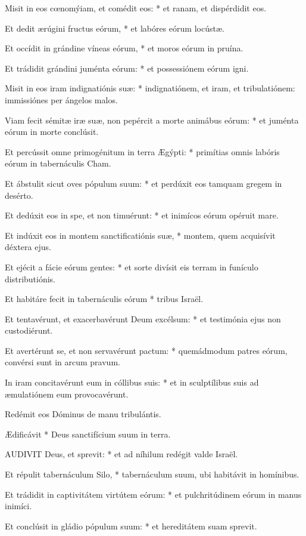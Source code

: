 Misit in eos cœnomýiam, et comédit eos: * et ranam, et dispérdidit eos.

Et dedit ærúgini fructus eórum, * et labóres eórum locústæ.

Et occídit in grándine víneas eórum, * et moros eórum in pruína.

Et trádidit grándini juménta eórum: * et possessiónem eórum igni.

Misit in eos iram indignatiónis suæ: * indignatiónem, et iram, et tribulatiónem: immissiónes per ángelos malos.

Viam fecit sémitæ iræ suæ, non pepércit a morte animábus eórum: * et juménta eórum in morte conclúsit.

Et percússit omne primogénitum in terra Ægýpti: * primítias omnis labóris eórum in tabernáculis Cham.

Et ábstulit sicut oves pópulum suum: * et perdúxit eos tamquam gregem in desérto.

Et dedúxit eos in spe, et non timuérunt: * et inimícos eórum opéruit mare.

Et indúxit eos in montem sanctificatiónis suæ, * montem, quem acquisívit déxtera ejus.

Et ejécit a fácie eórum gentes: * et sorte divísit eis terram in funículo distributiónis.

Et habitáre fecit in tabernáculis eórum * tribus Israël.

Et tentavérunt, et exacerbavérunt Deum excélsum: * et testimónia ejus non custodiérunt.

Et avertérunt se, et non servavérunt pactum: * quemádmodum patres eórum, convérsi sunt in arcum pravum.

In iram concitavérunt eum in cóllibus suis: * et in sculptílibus suis ad æmulatiónem eum provocavérunt.

 Redémit eos Dóminus de manu tribulántis.

 Ædificávit * Deus sanctifícium suum in terra.


\lettrine[lines=2]{A}{UDIVIT} Deus, et sprevit: * et ad níhilum redégit valde Israël.

Et répulit tabernáculum Silo, * tabernáculum suum, ubi habitávit in homínibus.

Et trádidit in captivitátem virtútem eórum: * et pulchritúdinem eórum in manus inimíci.

Et conclúsit in gládio pópulum suum: * et hereditátem suam sprevit.

